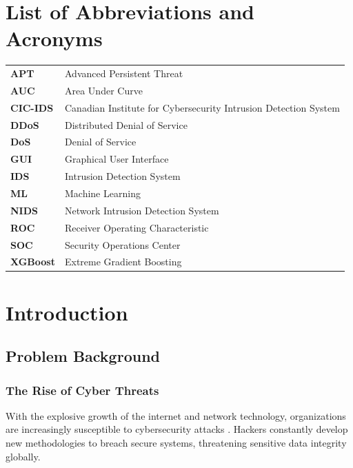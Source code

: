 \documentclass[12pt, a4paper]{report}
\begin{document}
\listoffigures
\clearpage

\listoftables
\clearpage

\chapter*{List of Abbreviations and Acronyms}
{}
\begin{tabularx}{\textwidth}{@{}l X@{}}
\textbf{APT} & Advanced Persistent Threat\\
\textbf{AUC} & Area Under Curve\\
\textbf{CIC-IDS} & Canadian Institute for Cybersecurity Intrusion Detection System\\
\textbf{DDoS} & Distributed Denial of Service\\
\textbf{DoS} & Denial of Service\\
\textbf{GUI} & Graphical User Interface\\
\textbf{IDS} & Intrusion Detection System\\
\textbf{ML} & Machine Learning\\
\textbf{NIDS} & Network Intrusion Detection System\\
\textbf{ROC} & Receiver Operating Characteristic\\
\textbf{SOC} & Security Operations Center\\
\textbf{XGBoost} & Extreme Gradient Boosting\\
\end{tabularx}
\clearpage

\clearpage
{}
\pagestyle{plain}

\chapter{Introduction}
\section{Problem Background}
\subsection{The Rise of Cyber Threats}
With the explosive growth of the internet and network technology, organizations are increasingly susceptible to cybersecurity attacks \cite{ref1}. Hackers constantly develop new methodologies to breach secure systems, threatening sensitive data integrity globally.
\end{document}
